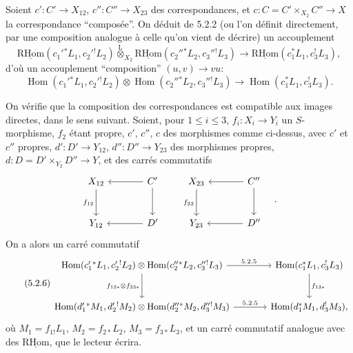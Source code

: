 \documentclass[11pt]{article}
\DeclareMathOperator{\Hom}{Hom}
\newcommand{\R}{\mathrm{R}}\newcommand{\RHomCore}{\mathrm{RHom}}
\providecommand{\RHom}{\RHomCore}
\providecommand{\uRHom}{\underline{\RHom}}
\providecommand{\RHom}{\RHomCore}
\providecommand{\Hom}{\operatorname{Hom}}
\providecommand{\RHom}{\R\mathcal{H}om}
\providecommand{\R}{\mathrm R}
\providecommand{\RHom}{\RHomCore}
\providecommand{\Hom}{\operatorname{Hom}}
\begin{document}
Soient $c':C'\to X_{12}$, $c'':C''\to X_{23}$ des correspondances, et $c:C=C'\times_{X_2}C''\to X$ la correspondance ``composée''. On déduit de 5.2.2 (ou l'on définit directement, par une composition analogue à celle qu'on vient de décrire) un accouplement
\begin{equation}
\tag{5.2.4}
\uRHom(c_1'{}^*L_1,c_2'{}^!L_2)\overset{\mathrm{L}}{\otimes}_{X_2}\uRHom(c_2''{}^*L_2,c_3''{}^!L_3)
\longrightarrow\uRHom(c_1^*L_1,c_3^!L_3),
\end{equation}
d'où un accouplement ``composition'' $(u,v)\longrightarrow vu$:
\begin{equation}
\tag{5.2.5}
\Hom(c_1'{}^*L_1,c_2'{}^!L_2)\otimes\Hom(c_2''{}^*L_2,c_3''{}^!L_3)
\longrightarrow\Hom(c_1^*L_1,c_3^!L_3).
\end{equation}

On vérifie que la composition des correspondances est compatible aux images directes, dans le sens suivant. Soient, pour $1\leq i\leq 3$, $f_i:X_i\to Y_i$ un $S$-morphisme, $f_2$ étant propre, $c'$, $c''$, $c$ des morphismes comme ci-dessus, avec $c'$ et $c''$ propres, $d':D'\to Y_{12}$, $d'':D''\to Y_{23}$ des morphismes propres, $d:D=D'\times_{Y_2}D''\to Y$, et des carrés commutatifs
\[
\begin{tikzcd}[column sep=large,row sep=large]
X_{12} \arrow[d,"f_{12}"'] & C' \arrow[l] \arrow[d] \\
Y_{12} & D' \arrow[l]
\end{tikzcd}
\qquad
\begin{tikzcd}[column sep=large,row sep=large]
X_{23} \arrow[d,"f_{23}"'] & C'' \arrow[l] \arrow[d] \\
Y_{23} & D'' \arrow[l]
\end{tikzcd}\quad .
\]
On a
alors un carré commutatif
\begin{equation}
\tag{5.2.6}
\begin{tikzcd}[column sep=large,row sep=large]
\Hom(c_1'{}^*L_1,c_2'{}^!L_2)\otimes\Hom(c_2''{}^*L_2,c_3''{}^!L_3) \arrow[r,"5.2.5"] \arrow[d,"f_{12*}\otimes f_{23*}"']
& \Hom(c_1^*L_1,c_3^!L_3) \arrow[d,"f_{13*}"] \\
\Hom(d_1'{}^*M_1,d_2'{}^!M_2)\otimes\Hom(d_2''{}^*M_2,d_3''{}^!M_3) \arrow[r,"5.2.5"]
& \Hom(d_1^*M_1,d_3^!M_3),
\end{tikzcd}
\end{equation}
où $M_1=f_{1!}L_1$, $M_2=f_{2*}L_2$, $M_3=f_{3*}L_3$, et un carré commutatif analogue avec des $\uRHom$, que le lecteur écrira.
\end{document}
